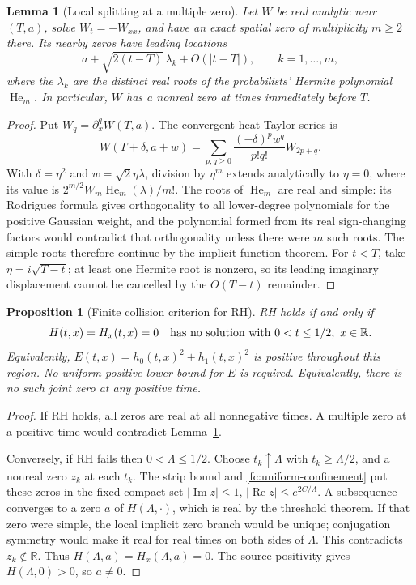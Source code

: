 \documentclass[11pt]{article}
\numberwithin{equation}{section}
\newtheorem{proposition}[theorem]{Proposition}
\newtheorem{lemma}[theorem]{Lemma}
\theoremstyle{definition}
\theoremstyle{remark}
\newcommand{\R}{\mathbb R}
\begin{document}
\begin{lemma}[Local splitting at a multiple zero]
\label{fc:hermite}
Let $W$ be real analytic near $(T,a)$, solve $W_t=-W_{xx}$, and have
an exact spatial zero of multiplicity $m\ge2$ there.  Its nearby zeros
have leading locations
\[
 a+\sqrt{2(t-T)}\,\lambda_k+O(|t-T|),\qquad k=1,\ldots,m,
\]
where the $\lambda_k$ are the distinct real roots of the probabilists'
Hermite polynomial $\operatorname{He}_m$.  In particular, $W$ has a
nonreal zero at times immediately before $T$.
\end{lemma}
\begin{proof}
Put $W_q=\partial_x^qW(T,a)$.  The convergent heat Taylor series is
\[
 W(T+\delta,a+w)=
 \sum_{p,q\ge0}\frac{(-\delta)^p w^q}{p!q!}W_{2p+q}.
\]
With $\delta=\eta^2$ and $w=\sqrt2\eta\lambda$, division by $\eta^m$
extends analytically to $\eta=0$, where its value is
$2^{m/2}W_m\operatorname{He}_m(\lambda)/m!$.
The roots of $\operatorname{He}_m$ are real and simple: its Rodrigues
formula gives orthogonality to all lower-degree polynomials for the
positive Gaussian weight, and the polynomial formed from its real
sign-changing factors would contradict that orthogonality unless there
were $m$ such roots. The simple roots therefore continue by the implicit function
theorem.  For $t<T$, take $\eta=i\sqrt{T-t}$; at least one Hermite root
is nonzero, so its leading imaginary displacement cannot be cancelled
by the $O(T-t)$ remainder.
\end{proof}

\begin{proposition}[Finite collision criterion for RH]
\label{fc:rh-collision}
RH holds if and only if
\begin{equation}
 H(t,x)=H_x(t,x)=0
 \quad\hbox{has no solution with }0<t\le1/2,\ x\in\R.
 \label{fc:collision-criterion}
\end{equation}
Equivalently, $E(t,x)=h_0(t,x)^2+h_1(t,x)^2$ is positive throughout
this region.  No uniform positive lower bound for $E$ is required. Equivalently,
there is no such joint zero at any positive time.
\end{proposition}
\begin{proof}
If RH holds, all zeros are real at all nonnegative times.  A multiple
zero at a positive time would contradict Lemma~\ref{fc:hermite}.

Conversely, if RH fails then $0<\Lambda\le1/2$.  Choose
$t_k\uparrow\Lambda$ with $t_k\ge\Lambda/2$, and a nonreal zero
$z_k$ at each $t_k$.  The strip bound and
\eqref{fc:uniform-confinement} put these zeros in the fixed compact set
$|\operatorname{Im}z|\le1$, $|\operatorname{Re}z|\le e^{2C/\Lambda}$.
A subsequence converges to a zero $a$ of $H(\Lambda,\cdot)$, which is
real by the threshold theorem.  If that zero were simple, the local
implicit zero branch would be unique; conjugation symmetry would make
it real for real times on both sides of $\Lambda$.  This contradicts
$z_k\notin\R$.  Thus $H(\Lambda,a)=H_x(\Lambda,a)=0$.
The source positivity gives $H(\Lambda,0)>0$, so $a\ne0$.
\end{proof}
\end{document}
